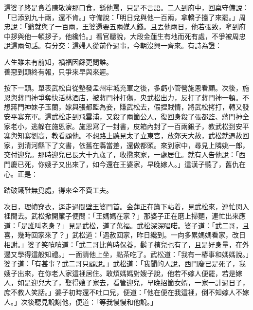 這婆子終是貪着陳敬濟那口食，繇他罵，只是不言語。{}二人到府中，回稟守備說：「已添到九十兩，還不肯。」守備說：「明日兌與他一百兩，拿轎子擡了來罷。」周忠說：「爺就與了一百兩，王婆還要五兩媒人錢。且丟他兩日，他若張致，拿到府中拶與他一頓拶子，他纔怕。」看官聽說，大段金蓮生有地而死有處，不爭被周忠說這兩句話。有分交：這婦人從前作過事，今朝沒興一齊來。有詩為證：

\begin{myquote}
人生雖未有前知，禍福因繇更問誰。\\善惡到頭終有報，只爭來早與來遲。
\end{myquote}

按下一頭。單表武松自從墊發孟州牢城充軍之後，多虧小管營施恩看顧。次後，施恩與蔣門神爭奪快活林酒店，被蔣門神打傷，央武松出力，反打了蔣門神一頓。不想蔣門神妹子玉蘭，嫁與張都監為妾，賺武松去，假捏賊情，將武松拷打，轉又發安平寨充軍。這武松走到飛雲浦，又殺了兩箇公人，復回身殺了張都監、蔣門神全家老小，逃躲在施恩家。施恩寫了一封書，皮箱內封了一百兩銀子，教武松到安平寨與知寨劉高，教看顧他。不想路上聽見太子立東宮，放郊天大赦，武松就遇赦回家，到清河縣下了文書，依舊在縣當差，還做都頭。來到家中，尋見上隣姚一郎，交付迎兒。那時迎兒已長大十九歲了，收攬來家，一處居住。就有人告他說：「西門慶已死，你嫂子又出來了，如今還在王婆家，早晚嫁人。」這漢子聽了，舊仇在心。正是：

\begin{myquote}
踏破鐵鞋無覓處，得來全不費工夫。
\end{myquote}

次日，理幘穿衣，逕走過間壁王婆門首。金蓮正在簾下站着，見武松來，連忙閃入裡間去。武松掀開簾子便問：「王媽媽在家？」那婆子正在磨上掃麵，連忙出來應道：「是誰叫老身？」見是武松，道了萬福。武松深深唱喏。婆子道：「武二哥，且喜，幾時回家來了？」武松道：「遇赦回家，昨日纔到。一向多累媽媽看家，改日相謝。」婆子笑嘻嘻道：「武二哥比舊時保養，鬍子楂兒也有了，且是好身量，在外邊又學得這般知禮。」{}一面請他上坐，點茶吃了。武松道：「我有一樁事和媽媽說。」婆子道：「有甚事？武二哥只顧說。」武松道：「我聞的人說，西門慶已是死了，我嫂子出來，在你老人家這裡居住。敢煩媽媽對嫂子說，他若不嫁人便罷，若是嫁人，如是迎兒大了，娶得嫂子家去，看管迎兒，早晚招箇女婿，一家一計過日子，庶不教人笑話。」婆子初時還不吐口兒，便道：「他在便在我這裡，倒不知嫁人不嫁人。」次後聽見說謝他，便道：「等我慢慢和他說。」{}

